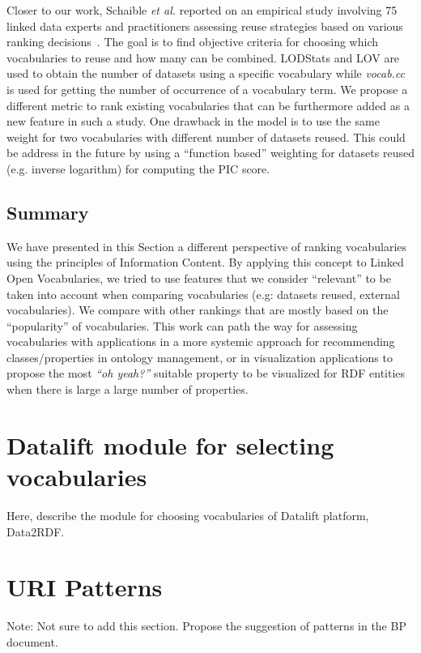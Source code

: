 Closer to our work, Schaible \emph{et al.} reported on an empirical study involving 75 linked data experts and practitioners assessing reuse strategies based on various ranking decisions~\cite{Schaible:ESWC14}. The goal is to find objective criteria for choosing which vocabularies to reuse and how many can be combined. LODStats and LOV are used to obtain the number of datasets using a specific vocabulary while \textit{vocab.cc} is used for getting the number of occurrence of a vocabulary term. We propose a different metric to rank existing vocabularies that can be furthermore added as a new feature in such a study. One drawback in the model is to use the same weight for two vocabularies with different number of datasets reused. This could be address in the future by using a ``function based'' weighting for datasets reused (e.g. inverse logarithm) for computing the PIC score.

\subsection{Summary}
We have presented in this Section a different perspective of ranking vocabularies using the principles of Information Content. By applying this concept to Linked Open Vocabularies, we tried to use features that we consider ``relevant'' to be taken into account when comparing vocabularies (e.g: datasets reused, external vocabularies). We compare with other rankings that are mostly based on the ``popularity'' of vocabularies. This work can path the way for assessing vocabularies with applications in a more systemic approach for recommending classes/properties in ontology management, or in visualization applications to propose the most \textit{``oh yeah?''} suitable property to be visualized for RDF entities when there is large a large number of properties.


\section{Datalift module for selecting vocabularies}
\label{sec:data2rdf}
Here, describe the module for choosing vocabularies of Datalift platform, Data2RDF. 

\section{URI Patterns}
\label{sec:uris}

Note: Not sure to add this section. Propose the suggestion of patterns in the BP document. 

